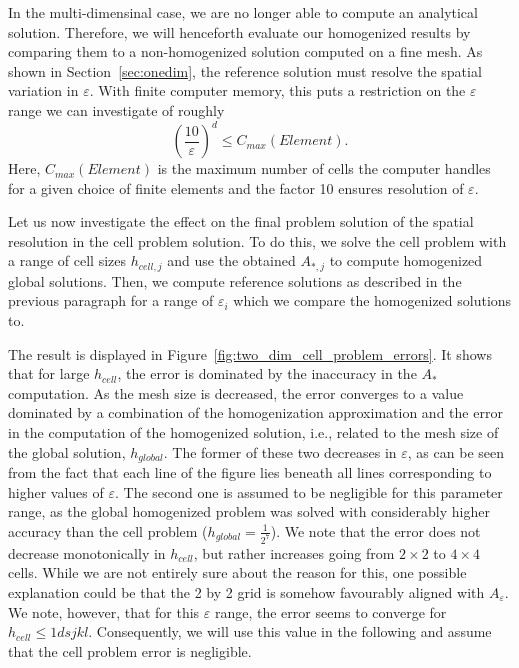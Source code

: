 \documentclass{article}
\renewcommand{\epsilon}{\varepsilon}
\begin{document}
 In the multi-dimensinal case, we are no longer able to compute an analytical solution. Therefore, we will henceforth evaluate our homogenized results by comparing them to a non-homogenized solution computed on a fine mesh. As shown in Section~\ref{sec:onedim}, the reference solution must resolve the spatial variation in $\epsilon$. With finite computer memory, this puts a restriction on the $\epsilon$ range we can investigate of roughly
\begin{equation}
    (\frac{10}{\epsilon})^d\leq C_{max}(Element).
    \label{eq:computational_restriction}
  \end{equation}
  Here, $C_{max}(Element)$ is the maximum number of cells the computer handles for a given choice of finite elements and the factor 10 ensures resolution of $\epsilon$.
  
  Let us now investigate the effect on the final problem solution of the spatial resolution in the cell problem solution. To do this, we solve the cell problem with a range of cell sizes $h_{cell,j}$ and use the obtained $A_{*,j}$ to compute homogenized global solutions. Then, we compute reference solutions as described in the previous paragraph for a range of $\epsilon_i$ which we compare the homogenized solutions to.

  The result is displayed in Figure~\ref{fig:two_dim_cell_problem_errors}. It shows that for large $h_{cell}$, the error is dominated by the inaccuracy in the $A_{*}$ computation. As the mesh size is decreased, the error converges to a value dominated by a combination of the homogenization approximation and the error in the computation of the homogenized solution, i.e., related to the mesh size of the global solution, $h_{global}$. The former of these two decreases in $\epsilon$, as can be seen from the fact that each line of the figure lies beneath all lines corresponding to higher values of $\epsilon$. The second one is assumed to be negligible for this parameter range, as the global homogenized problem was solved with considerably higher accuracy than the cell problem ($h_{global}=\frac{1}{2^7}$).
  We note that the error does not decrease monotonically in $h_{cell}$, but rather increases going from $2 \times 2$ to $4 \times 4$ cells. While we are not entirely sure about the reason for this, one possible explanation could be that the 2 by 2 grid is somehow favourably aligned with $A_{\epsilon}$. We note, however, that for this $\epsilon$ range, the error seems to converge for $h_{cell}\leq 1dsjkl$. Consequently, we will use this value in the following and assume that the cell problem error is negligible.
\end{document}
